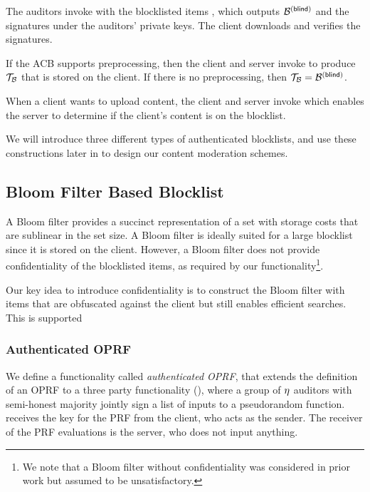 \enumListStart
\item The auditors invoke \publishList with the blocklisted items \blocklist, which outputs $\blindedBlocklist$ and the signatures under the auditors' private keys. The client downloads \blindedBlocklist and verifies the signatures. 
\item If the ACB supports preprocessing, then the client and server invoke \preprocess to produce $\blklistToken$ that is stored on the client. If there is no preprocessing, then $\blklistToken = \blindedBlocklist$. 
\item When a client wants to upload content, the client and server invoke \searchBlocklist which enables the server to determine if the client's content is on the blocklist. 
\enumListEnd

We will introduce three different types of authenticated blocklists, and use these constructions later in \secref{} to design our content moderation schemes. 



\subsection{Bloom Filter Based Blocklist}
%
A Bloom filter provides a succinct representation of a set with storage costs that are sublinear in the set size. A Bloom filter is ideally suited for a large blocklist since it is stored on the client. However, a Bloom filter does not provide confidentiality of the blocklisted items, as required by our functionality\footnote{We note that a Bloom filter without confidentiality was considered in prior work but assumed to be unsatisfactory.}. 


Our key idea to introduce confidentiality is to construct the Bloom filter with items that are obfuscated against the client but still enables efficient searches. This is supported 




\subsubsection{Authenticated OPRF}
%
We define a functionality called \emph{authenticated OPRF}, that extends the definition of an OPRF to a three party functionality \authOPRFFunc (), where a group of $\eta$ auditors with semi-honest majority jointly sign a list of inputs to a pseudorandom function. \authOPRFFunc receives the key for the PRF from the client, who acts as the sender. The receiver of the PRF evaluations is the server, who does not input anything.



